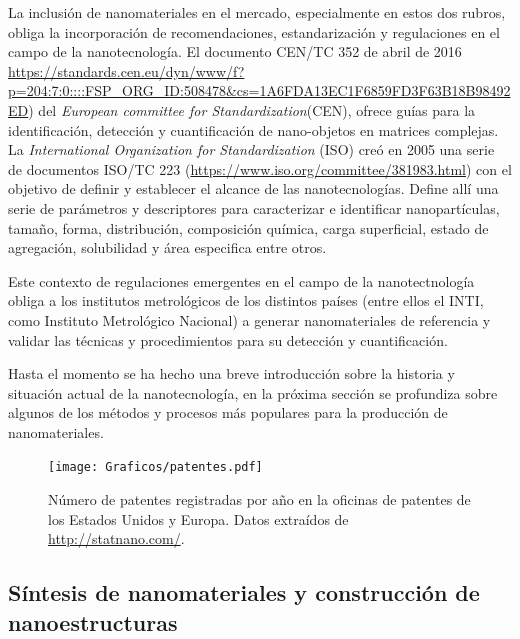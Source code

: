  	 La inclusión de nanomateriales en el mercado, especialmente en estos dos rubros, obliga la incorporación de recomendaciones, estandarización y regulaciones en el campo de la nanotecnología. El\hspace{1pt} documento\hspace{1pt} CEN/TC\hspace{1pt} 352 de abril de 2016 \url{https://standards.cen.eu/dyn/www/f?p=204:7:0::::FSP_ORG_ID:508478&cs=1A6FDA13EC1F6859FD3F63B18B98492ED})
 	 del \textit{European committee for Standardization}(CEN), ofrece guías para la identificación, detección y cuantificación de nano-objetos en matrices complejas. La \textit{International Organization for Standardization} (ISO) creó en 2005 una serie de documentos ISO/TC 223 (\url{https://www.iso.org/committee/381983.html}) con el objetivo de definir y establecer el alcance de las nanotecnologías. Define allí una serie de parámetros y descriptores para caracterizar e identificar nanopartículas, tamaño, forma, distribución, composición química, carga superficial, estado de agregación, solubilidad y área especifica entre otros.

 	 Este contexto de regulaciones emergentes en el campo de la nanotectnología obliga a los institutos metrológicos de los distintos países (entre ellos el INTI, como Instituto Metrológico Nacional) a generar nanomateriales de referencia y validar las técnicas y procedimientos para su detección y cuantificación.

 	 Hasta el momento se ha hecho una breve introducción sobre la historia y situación actual de la nanotecnología, en la próxima sección se profundiza sobre algunos de los métodos y procesos más populares para la producción de nanomateriales.


		\begin{figure}[h!]
 			\begin{center}
 			\texttt{[image: Graficos/patentes.pdf]}
 			\vspace*{-0.3cm}
 			\caption[Número de patentes de productos en base nanotecnológica]{Número de patentes registradas por año en la oficinas de patentes de los Estados Unidos y Europa. Datos extraídos de \url{http://statnano.com/}.}
 			\label{fig:patentes}
 		    \end{center}
 		    \end{figure}

 	\vspace*{-0.6cm}\subsection{Síntesis de nanomateriales y construcción de nanoestructuras}

